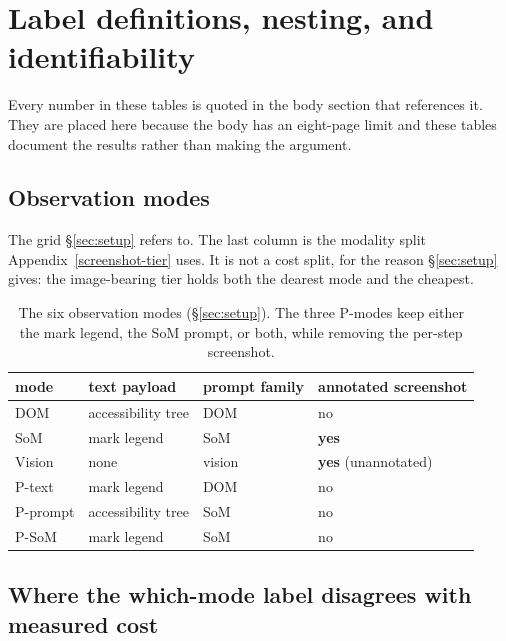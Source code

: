 \section{Label definitions, nesting, and identifiability}\label{supporting-tables}

Every number in these tables is quoted in the body section that references it. They are placed here because the body has an eight-page limit and these tables document the results rather than making the argument.

\subsection{Observation modes}\label{observation-modes}

The grid \S\ref{sec:setup} refers to. The last column is the modality split Appendix~\ref{screenshot-tier} uses. It is not a cost split, for the reason \S\ref{sec:setup} gives: the image-bearing tier holds both the dearest mode and the cheapest.

\begin{table}[t]
\centering
\caption{The six observation modes (\S\ref{sec:setup}). The three P-modes keep either the mark legend, the SoM prompt, or both, while removing the per-step screenshot.}
\small
\setlength{\tabcolsep}{4pt}
\begin{tabular}{@{}llll@{}}
\toprule
mode & text payload & prompt family & annotated screenshot \\
\midrule
DOM & accessibility tree & DOM & no \\
SoM & mark legend & SoM & \textbf{yes} \\
Vision & none & vision & \textbf{yes} (unannotated) \\
P-text & mark legend & DOM & no \\
P-prompt & accessibility tree & SoM & no \\
P-SoM & mark legend & SoM & no \\
\bottomrule
\end{tabular}
\end{table}

\subsection{Where the which-mode label disagrees with measured cost}\label{where-the-which-mode-label-disagrees-with-measured-cost}

